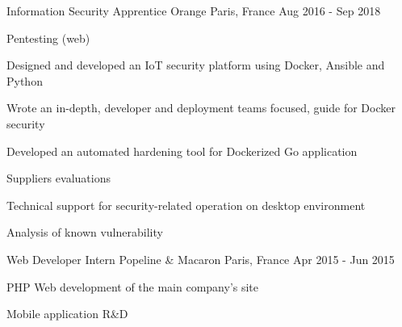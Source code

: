 

\begin{cventries}

  \cventry
    {Information Security Apprentice } %
    {Orange} %
    {Paris, France} %
    {Aug 2016 - Sep 2018} %
    {
      \begin{cvitems} %
        \item {Pentesting (web)}
        \item {Designed and developed an IoT security platform using Docker, Ansible and Python}
        \item {Wrote an in-depth, developer and deployment teams focused, guide for Docker security}
        \item {Developed an automated hardening tool for Dockerized Go application}
        \item {Suppliers evaluations}
        \item {Technical support for security-related operation on desktop environment}
        \item {Analysis of known vulnerability}
      \end{cvitems}
    }
  \cventry
    {Web Developer Intern} %
    {Popeline \& Macaron} %
    {Paris, France} %
    {Apr 2015 - Jun 2015} %
    {
      \begin{cvitems} %
        \item {PHP Web development of the main company's site}
        \item {Mobile application R\&D}
      \end{cvitems}
    }
\end{cventries}
